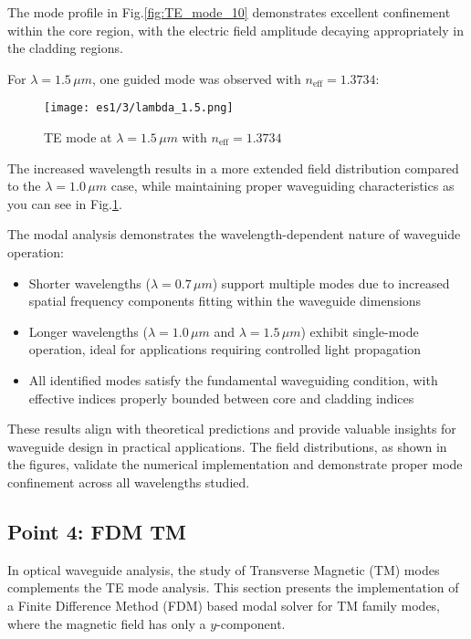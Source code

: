 \documentclass{article}
\begin{document}
The mode profile in Fig.\ref{fig:TE_mode_10} demonstrates excellent confinement within the core region, with the electric field amplitude decaying appropriately in the cladding regions.

For $\lambda = 1.5\,\mu m$, one guided mode was observed with $n_{\text{eff}} = 1.3734$:

\begin{figure}[h]
\centering
\texttt{[image: es1/3/lambda\_1.5.png]}
\caption{TE mode at $\lambda = 1.5\,\mu m$ with $n_{\text{eff}} = 1.3734$}
\label{fig:TE_mode_15}
\end{figure}

The increased wavelength results in a more extended field distribution compared to the $\lambda = 1.0\,\mu m$ case, while maintaining proper waveguiding characteristics as you can see in Fig.\ref{fig:TE_mode_15}.

The modal analysis demonstrates the wavelength-dependent nature of waveguide operation:
\begin{itemize}
\item Shorter wavelengths ($\lambda = 0.7\,\mu m$) support multiple modes due to increased spatial frequency components fitting within the waveguide dimensions
\item Longer wavelengths ($\lambda = 1.0\,\mu m$ and $\lambda = 1.5\,\mu m$) exhibit single-mode operation, ideal for applications requiring controlled light propagation
\item All identified modes satisfy the fundamental waveguiding condition, with effective indices properly bounded between core and cladding indices
\end{itemize}

These results align with theoretical predictions and provide valuable insights for waveguide design in practical applications. The field distributions, as shown in the figures, validate the numerical implementation and demonstrate proper mode confinement across all wavelengths studied.












\subsection{Point 4: FDM TM}

In optical waveguide analysis, the study of Transverse Magnetic (TM) modes complements the TE mode analysis. This section presents the implementation of a Finite Difference Method (FDM) based modal solver for TM family modes, where the magnetic field has only a $y$-component.
\end{document}
